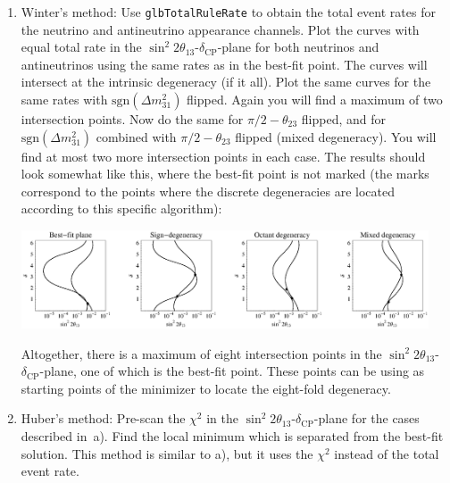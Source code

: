 \documentclass[12pt,a4paper]{article}
\begin{document}
\begin{enumerate}
\item
 Winter's method: Use {\tt glbTotalRuleRate} to obtain the total event rates for the neutrino and antineutrino appearance
channels. Plot the curves with equal total rate in the $\sin^2 2 \theta_{13}$-$\delta_{\mathrm{CP}}$-plane for both neutrinos and antineutrinos using the same rates as in the best-fit point. The curves will intersect at the intrinsic degeneracy (if it all). Plot the same curves for the same rates with $\mathrm{sgn}(\Delta m_{31}^2)$ flipped. Again you will find a maximum of two intersection points. Now do the same for $\pi/2 - \theta_{23}$ flipped, and for  $\mathrm{sgn}(\Delta m_{31}^2)$ combined with $\pi/2 - \theta_{23}$ flipped (mixed degeneracy). You will find at most two more intersection points in each case.
The results should look somewhat like this, where the best-fit point is not marked (the marks correspond to the points where the discrete degeneracies are located according to this specific algorithm):
\begin{center}
\includegraphics[width=0.95\textwidth]{ircurves}
\end{center}
 Altogether, there is a maximum of eight intersection points in the $\sin^2 2 \theta_{13}$-$\delta_{\mathrm{CP}}$-plane, one of which is the best-fit point. These points can be using as starting points of the minimizer to locate the eight-fold degeneracy.
\item
 Huber's method:
 Pre-scan the $\chi^2$ in the $\sin^2 2 \theta_{13}$-$\delta_{\mathrm{CP}}$-plane for the cases described in~a). Find the local minimum which is separated from the best-fit solution. This method is similar to a), but it uses the $\chi^2$ instead of the total event rate. 
\end{enumerate}



\end{document}
